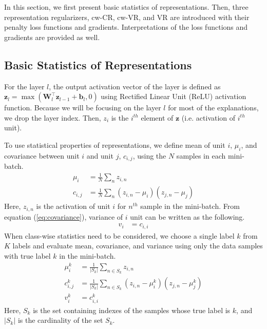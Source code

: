 In this section, we first present basic statistics of representations. Then, three representation regularizers, cw-CR, cw-VR, and VR are introduced with their penalty loss functions and gradients. Interpretations of the loss functions and gradients are provided as well. 

\subsection{Basic Statistics of Representations}
\label{subsection:stats}
For the layer $l$, the output activation vector of the layer is defined as 
$\mathbf{z}_l = \max(\mathbf{W}^\top_l \mathbf{z}_{l-1} + \mathbf{b}_l, 0)$ using Rectified Linear Unit (ReLU)
activation function. Because we will be focusing on the layer $l$ for most of the explanations, 
we drop the layer index. 
Then, $z_i$ is the $i^{th}$ element of $\mathbf{z}$ (i.e. activation of $i^{th}$ unit). 

To use statistical properties of representations, we define mean of unit $i$, $\mu_i$, and covariance 
between unit $i$ and unit $j$, $\textit{c}_{i,j}$, using the $N$ samples in each mini-batch. 
\begin{align}
    \mu_i &= \frac{1}{N} \sum_n z_{i,n}  \label{eq:mean}  \\
    \textit{c}_{i,j} &= \frac{1}{N} \sum_n (z_{i,n} - \mu_i)(z_{j,n} - \mu_j) \label{eq:covariance}
\end{align}
Here, $z_{i,n}$ is the activation of unit $i$ for $n^{th}$ sample in the mini-batch.  
From equation (\ref{eq:covariance}), variance of $i$ unit can be written as the following. 
\begin{align}
    \textit{v}_{i} &= \textit{c}_{i,i} \label{eq:variance}
\end{align}
When class-wise statistics need to be considered, we choose a single label $k$ from $K$ labels
and evaluate mean, covariance, and variance using only the data samples with true label $k$
in the mini-batch. 
\begin{align}
    \mu_i^k &= \frac{1}{|S_k|} \sum_{n \in S_k} z_{i,n} \label{eq:mean_cw} \\
    \textit{c}_{i,j}^k &= \frac{1}{|S_k|} \sum_{n \in S_k} (z_{i,n} - \mu_i^k)(z_{j,n} - \mu_j^k) \label{eq:covariance_cw}  \\  
    \textit{v}_{i}^k &= \textit{c}_{i,i}^k   \label{eq:variance_cw}
\end{align}
Here, $S_k$ is the set containing indexes of the samples whose true label is $k$, 
and $|S_k|$ is the cardinality of the set $S_k$.

